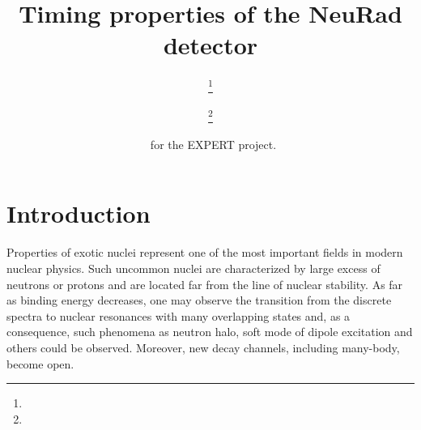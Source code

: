 \documentclass{webofc}
\begin{document}
\title{Timing properties of the NeuRad detector}

\author{ \fnsep\thanks{} \and
	 \fnsep\thanks{} \and
	  \and
	  \and
	  \and
	  \and
	  \and
	  \and
	  \and
	  \ for the EXPERT project.
}
%
\maketitle
%
\section{Introduction}
Properties of exotic nuclei represent one of the most important fields in modern nuclear physics.
Such uncommon nuclei are characterized by large excess of neutrons or protons and are located far from the line of nuclear stability. As far as binding energy decreases, one may observe the transition from the discrete spectra to nuclear resonances with many overlapping states and, as a consequence, such phenomena as neutron halo, soft mode of dipole excitation and others could be observed. Moreover, new decay channels, including many-body, become open.
\end{document}
